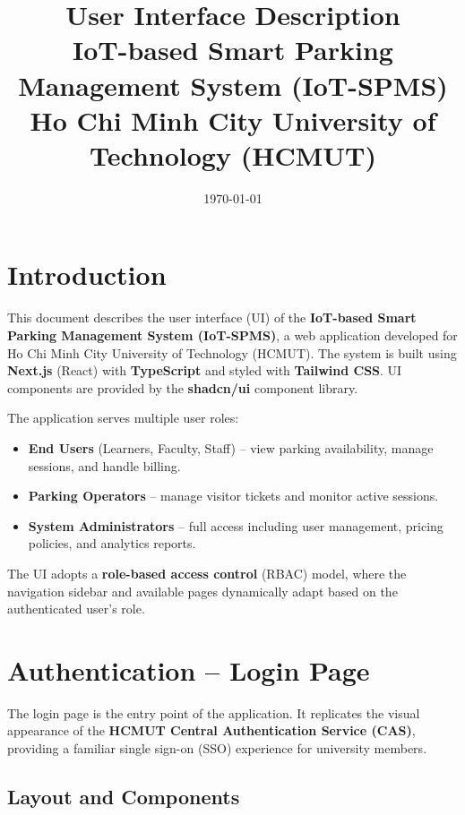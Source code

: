 \documentclass[12pt,a4paper]{article}
\title{
    \vspace{-1cm}
    \textbf{User Interface Description} \\[0.3cm]
    \large IoT-based Smart Parking Management System (IoT-SPMS) \\[0.2cm]
    \normalsize Ho Chi Minh City University of Technology (HCMUT)
}
\author{}
\date{\today}
\begin{document}
\maketitle
\thispagestyle{fancy}

\tableofcontents
\newpage

\section{Introduction}

This document describes the user interface (UI) of the \textbf{IoT-based Smart Parking Management System (IoT-SPMS)}, a web application developed for Ho Chi Minh City University of Technology (HCMUT). The system is built using \textbf{Next.js} (React) with \textbf{TypeScript} and styled with \textbf{Tailwind CSS}. UI components are provided by the \textbf{shadcn/ui} component library.

The application serves multiple user roles:
\begin{itemize}
    \item \textbf{End Users} (Learners, Faculty, Staff) -- view parking availability, manage sessions, and handle billing.
    \item \textbf{Parking Operators} -- manage visitor tickets and monitor active sessions.
    \item \textbf{System Administrators} -- full access including user management, pricing policies, and analytics reports.
\end{itemize}

The UI adopts a \textbf{role-based access control} (RBAC) model, where the navigation sidebar and available pages dynamically adapt based on the authenticated user's role.

\section{Authentication -- Login Page}
\label{sec:login}

The login page is the entry point of the application. It replicates the visual appearance of the \textbf{HCMUT Central Authentication Service (CAS)}, providing a familiar single sign-on (SSO) experience for university members.

\subsection{Layout and Components}
\end{document}
